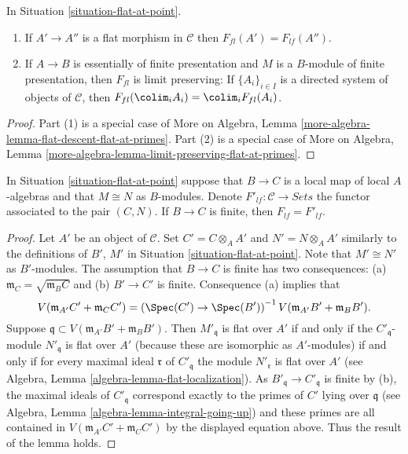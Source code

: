 \begin{lemma}
\label{lemma-flat-at-point}
In Situation \ref{situation-flat-at-point}.
\begin{enumerate}
\item If $A' \to A''$ is a flat morphism in $\mathcal{C}$
then $F_{fl}(A') = F_{lf}(A'')$.
\item If $A \to B$ is essentially of finite presentation and
$M$ is a $B$-module of finite presentation, then $F_{fl}$ is limit
preserving: If $\{A_i\}_{i \in I}$ is a
directed system of objects of $\mathcal{C}$, then
$F_{fl}(\colim_i A_i) = \colim_i F_{fl}(A_i)$.
\end{enumerate}
\end{lemma}

\begin{proof}
Part (1) is a special case of
More on Algebra,
Lemma \ref{more-algebra-lemma-flat-descent-flat-at-primes}.
Part (2) is a special case of
More on Algebra,
Lemma \ref{more-algebra-lemma-limit-preserving-flat-at-primes}.
\end{proof}

\begin{lemma}
\label{lemma-flat-at-point-finite}
In
Situation \ref{situation-flat-at-point}
suppose that $B \to C$ is a local map of local $A$-algebras
and that $M \cong N$ as $B$-modules.
Denote $F'_{lf} : \mathcal{C} \to \textit{Sets}$ the
functor associated to the pair $(C, N)$.
If $B \to C$ is finite, then $F_{lf} = F'_{lf}$.
\end{lemma}

\begin{proof}
Let $A'$ be an object of $\mathcal{C}$. Set $C' = C \otimes_A A'$
and $N' = N \otimes_A A'$ similarly to the definitions of $B'$, $M'$ in
Situation \ref{situation-flat-at-point}.
Note that $M' \cong N'$ as $B'$-modules.
The assumption that $B \to C$ is finite has two consequences:
(a) $\mathfrak m_C = \sqrt{\mathfrak m_B C}$ and (b)
$B' \to C'$ is finite. Consequence (a) implies that
$$
V(\mathfrak m_{A'}C' + \mathfrak m_C C')
=
\left(
\Spec(C') \to \Spec(B')
\right)^{-1}V(\mathfrak m_{A'}B' + \mathfrak m_B B').
$$
Suppose $\mathfrak q \subset V(\mathfrak m_{A'}B' + \mathfrak m_B B')$.
Then $M'_{\mathfrak q}$ is flat over $A'$ if and only if
the $C'_{\mathfrak q}$-module $N'_{\mathfrak q}$ is flat over $A'$
(because these are isomorphic as $A'$-modules) if and only if
for every maximal ideal $\mathfrak r$ of $C'_{\mathfrak q}$
the module $N'_{\mathfrak r}$ is flat over $A'$ (see
Algebra, Lemma \ref{algebra-lemma-flat-localization}).
As $B'_{\mathfrak q} \to C'_{\mathfrak q}$ is finite by (b),
the maximal ideals of $C'_{\mathfrak q}$ correspond exactly
to the primes of $C'$ lying over $\mathfrak q$ (see
Algebra, Lemma \ref{algebra-lemma-integral-going-up})
and these primes are all contained in
$V(\mathfrak m_{A'}C' + \mathfrak m_C C')$ by
the displayed equation above. Thus the result of the lemma holds.
\end{proof}

